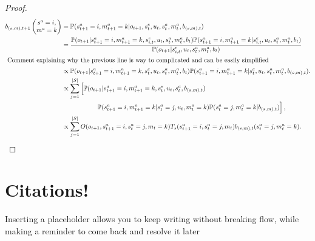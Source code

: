 \documentclass{article}
\begin{document}
\begin{proof}
\begin{align}
     b_{(s,m),t+1}\left(\begin{matrix}
        s^a = i, \\ m^a = k
    \end{matrix} \right) &= \mathbb{P}( s_{t+1}^a = i, m_{t+1}^a = k | o_{t+1}, s_{t}^e, u_{t}, s_t^a, m_t^a, b_{(s,m),t} ) \\
    &= \frac{\mathbb{P}( o_{t+1} | s_{t+1}^a = i, m_{t+1}^a = k, s_{i,t}^e, u_{t},  s_t^a, m_t^a, b_{t} ) \mathbb{P}( s_{t+1}^a = i, m_{t+1}^a = k |  s_{i,t}^e, u_{t},  s_t^a, m_t^a, b_{t} )}{\mathbb{P}(o_{t+1} | s_{i,t}^e, u_{t}, s_t^a, m_t^a, b_{t}   ) } \\
    \shortintertext{ Comment explaining why the previous line is way to complicated and can be easily simplified } 
          &\propto \mathbb{P}( o_{t+1} |  s_{t+1}^a = i, m_{t+1}^a = k, s_t^e, u_{t}, s_t^a, m_t^a, b_{t} ) \mathbb{P}( s_{t+1}^a = i, m_{t+1}^a = k |  s_t^e, u_{t}, s_{t}^a, m_{t}^a, b_{(s,m),t} ).  \\
    &\propto \sum_{j=1}^{|S|} \left[ \mathbb{P}( o_{t+1} |  s_{t+1}^a = i, m_{t+1}^a = k, s_t^e, u_{t}, s_t^a, b_{(s,m),t} ) \right. \nonumber \\ 
    &~~~~~~~~~~~~~~~~\left. \mathbb{P}( s_{t+1}^a = i, m_{t+1}^a = k | s_{t}^a=j, u_{t}, m_t^a = k ) \mathbb{P}( s_{t}^a = j, m_{t}^a = k |  b_{(s,m),t} ) \right],   \\
    &\propto  \sum_{j=1}^{|S|} O(o_{t+1},s_{t+1}^a=i,s_t^a=j,m_t=k) T_s(s_{t+1}^a=i, s_{t}^a=j, m_t ) b_{(s,m),t}(s_t^a = j, m_{t}^a = k).
\end{align}
 
\end{proof}

\newpage
\section{Citations!}

Inserting a placeholder allows you to keep writing without breaking flow, while making a reminder to come back and resolve it later
\end{document}
